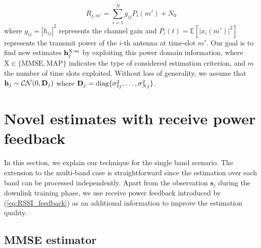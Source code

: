 \documentclass[francais]{gretsi}
\newcommand{\diag}{\mathrm{diag}}
\begin{document}
\begin{equation}
R_{j,m'}= \sum_{i=1}^N g_{ij} P_i(m') + N_0
\label{eq:RSSI_feedback}
\end{equation}
where $g_{ij}=|h_{ij}|^2$ represents the channel gain and $P_i(t) = \mathbb{E}[|x_i(m')|^2]$ represents the transmit power of the $i$-th antenna at time-slot $m'$. Our goal is to find new estimates $\bold{h}_j^{\text{X}:m}$ by exploiting this power domain information, where $\text{X}\in\{\text{MMSE}, \text{MAP}\}$ indicates the type of considered estimation criterion, and $m$ the number of time slots exploited. Without loss of generality, we assume that $\bold{h}_j\sim \mathcal{CN}(0,\bold{D}_j)$ where $\bold{D}_j=\diag\{\sigma_{1j}^2,\dots,\sigma_{Nj}^2\}$.  
\section{Novel estimates with receive power feedback}
In this section, we explain our technique for the single band scenario. The extension to the multi-band case is straightforward since the estimation over each band can be processed independently.  Apart from the observation $\mathbf{s}_j$ during the downlink training phase, we use receive power feedback introduced by (\ref{eq:RSSI_feedback}) as an additional information to improve the estimation quality.
\subsection{MMSE estimator}
\end{document}
